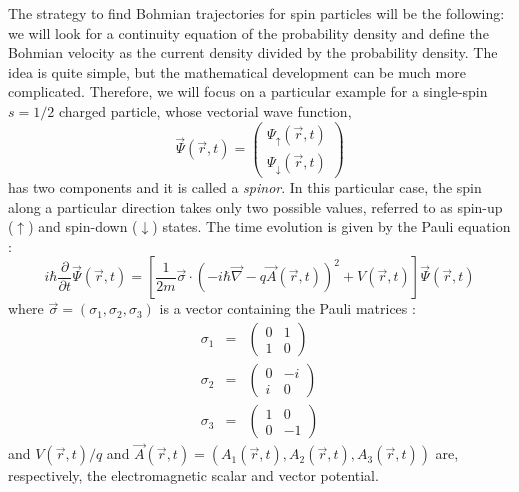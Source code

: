 \documentclass[onecolumn,nofootinbib, secnumarabic, amsmath, nobibnotes,12pt,aps,pra]{revtex4-1}
\begin{document}
The strategy to find Bohmian trajectories for spin particles will be the following: we will look for a continuity equation of the probability density and define the Bohmian velocity as the current density divided by the probability density.
The idea is quite simple, but the mathematical development can be much more complicated. Therefore, we will focus on a particular example for a single-spin $s = 1/2$ charged particle, whose vectorial wave function,
\begin{equation}
\vec \Psi(\vec r,t) = \left(
\begin{array}{c}
\Psi_{\uparrow}(\vec r,t) \\ \Psi_{\downarrow}(\vec r,t)
\end{array}
\right)
\end{equation}
has two components and it is called a \textit{spinor}. In this particular case, the spin along a particular direction takes only two possible values, referred to as spin-up ($\uparrow$) and spin-down ($\downarrow$) states.
The time evolution is given by the Pauli equation \cite{om.ward}:
\begin{equation}
\label{om.pauli}
i \hbar \frac{ \partial}{\partial t} \vec \Psi(\vec r,t) =
\left[ \frac{1}{2m} \vec{\sigma} \cdot \left(- i \hbar \vec{\nabla} - q \vec{A} (\vec r,t) \right) ^2 + V(\vec r,t) \right]
\vec \Psi(\vec r,t)
\end{equation}
where $\vec{\sigma} = (\sigma_1, \sigma_2, \sigma_3)$ is a vector containing the Pauli matrices \cite{om.landaulif}:
\begin{eqnarray}
\sigma_1 & = & \begin{pmatrix} 0&1 \\ 1&0 \end{pmatrix}  \\
\sigma_2 & = & \begin{pmatrix} 0&-i \\ i&0 \end{pmatrix} \\
\sigma_3 & = & \begin{pmatrix} 1&0 \\ 0&-1 \end{pmatrix}
\end{eqnarray}
and $V(\vec r,t)/q$ and $\vec{A}(\vec r,t) = (A_1(\vec r,t),A_2(\vec r,t),A_3(\vec r,t))$ are, respectively, the electromagnetic scalar and vector potential.
\end{document}
